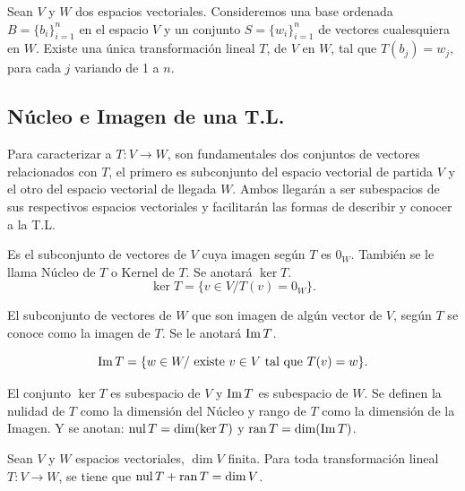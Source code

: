 \begin{thm}
Sean $V$ y $W$ dos espacios vectoriales. Consideremos una base ordenada $B=\{b_i\}_{i=1}^{n}$
en el espacio $V$ y un conjunto $S =\{w_i\}_{i=1}^{n}$ de vectores cualesquiera en $W$. Existe una única transformación lineal $T$, de $ V$ en $ W$, tal que $T(b_j) =w_j$, para cada $j$ variando de 1 a $n$.
\end{thm}

\subsection{Núcleo e Imagen de una T.L.}
Para caracterizar a $T:V \to W$, son fundamentales dos
conjuntos de vectores relacionados con $T$, el primero es subconjunto del espacio vectorial de partida $V$ y el otro del espacio vectorial de llegada $W$. Ambos llegarán a ser subespacios de sus
respectivos espacios vectoriales y facilitarán las formas de describir y conocer a la T.L.

\begin{defin}
Es el subconjunto de vectores de $V$ cuya imagen según $T$ es $0_W$.
También se le llama N\'ucleo de $T$ o Kernel de $T$. Se
anotará $\ker T$.
\[\ker T = \{v\in V / T(v) = 0_W\}.\]

El subconjunto de vectores de $W$ que son imagen de algún
vector de $V$, según $T$ se conoce como la imagen de $T$. Se le
anotará $\operatorname{Im} T$.

\[\operatorname{Im} T = \{w\in W / \text{ existe }v\in V \text{ tal que }T(v) = w\}.\]

El conjunto $\ker T$ es subespacio de $V$ y $\operatorname{Im} T$ es subespacio de $W$. Se definen la nulidad de $T$ como la dimensión del Núcleo y rango de $T$ como la dimensión de la Imagen.
Y se anotan: $\operatorname{nul} T = \dim(\ker T)$ y $\operatorname{ran} T = \dim(\operatorname{Im} T )$.
\end{defin}

\begin{thm}
Sean $V$ y $W$ espacios vectoriales, $\dim V$ finita. Para toda transformaci\'on lineal $T:V \to W$, se tiene que  $\operatorname{nul} T + \operatorname{ran} T = \dim V$.
\end{thm}

